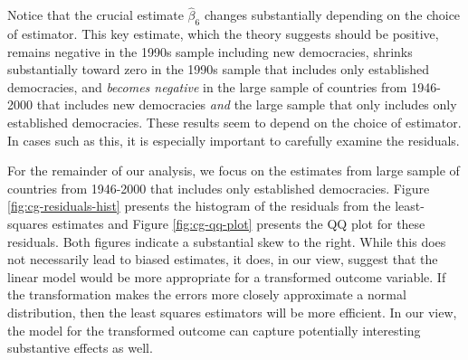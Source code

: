 \documentclass[12pt]{article}
\begin{document}
Notice that the crucial estimate $\hat{\beta}_6$ changes substantially depending on the choice of estimator. This key estimate, which the theory suggests should be positive, remains negative in the 1990s sample including new democracies, shrinks substantially toward zero in the 1990s sample that includes only established democracies, and \textit{becomes negative} in the large sample of countries from 1946-2000 that includes new democracies \textit{and} the large sample that only includes only established democracies. These results seem to depend on the choice of estimator. In cases such as this, it is especially important to carefully examine the residuals.

For the remainder of our analysis, we focus on the estimates from large sample of countries from 1946-2000 that includes only established democracies. Figure \ref{fig:cg-residuals-hist} presents the histogram of the residuals from the least-squares estimates and Figure \ref{fig:cg-qq-plot} presents the QQ plot for these residuals. Both figures indicate a substantial skew to the right. While this does not necessarily lead to biased estimates, it does, in our view, suggest that the linear model would be more appropriate for a transformed outcome variable. If the transformation makes the errors more closely approximate a normal distribution, then the least squares estimators will be more efficient. In our view, the model for the transformed outcome can capture potentially interesting substantive effects as well.
\end{document}
